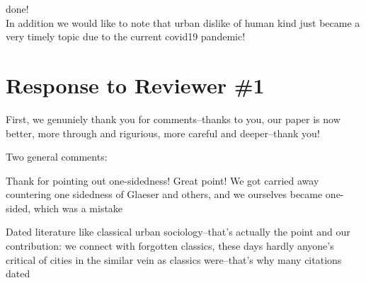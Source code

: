 done!\\ 

In addition we would like to note that urban dislike of human kind just became a
very timely topic due to the current covid19 pandemic!










 
\newpage
\section{Response to Reviewer \#1} 

First, we genuniely thank you for comments--thanks to you, our paper is now
better, more through and rigurious, more careful and deeper--thank you!

Two general comments:

Thank for pointing out one-sidedness! Great point! We got carried away
countering one sidedness of Glaeser and others, and we ourselves became
one-sided, which was a mistake

Dated literature like classical urban sociology--that's actually the point and
our contribution: we connect with forgotten classics, these days hardly anyone's
critical of cities in the similar vein as classics were--that's why many citations dated 

